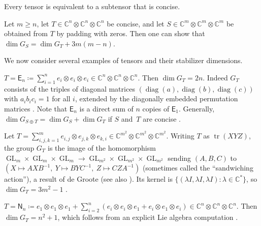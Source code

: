 \documentclass[11pt,a4paper]{article}
\numberwithin{equation}{section}
\newcommand{\CC}{\mathbb{C}}
\DeclareMathOperator{\GL}{GL}
\DeclareMathOperator{\diag}{diag}
\DeclareMathOperator{\tr}{tr}
\begin{document}
\begin{remark}[{\cite[Lemma~1.15]{MR4965400}}]
Every tensor is equivalent to a subtensor that is concise.
\end{remark}

\begin{remark}\label{rem:padding}
Let $m \geq n$, let $T \in \CC^n \otimes \CC^n \otimes \CC^n$ be concise, and let $S \in \CC^m \otimes \CC^m \otimes \CC^m$ be obtained from $T$ by padding with zeros. Then one can show that $\dim G_S = \dim G_T + 3m(m-n)$.
\end{remark}

%
%
%

We now consider several examples of tensors and their stabilizer dimensions.

\begin{example}[Diagonal]\label{ex:scalar}\label{ex:unit}
$T = \mathsf{E}_n \coloneqq \sum_{i=1}^n e_i \otimes e_i \otimes e_i \in \CC^n \otimes \CC^n \otimes \CC^n$. Then $\dim G_T = 2n$. Indeed $G_T$ consists of the triples of diagonal matrices $(\diag(a),\diag(b),\diag(c))$ with $a_ib_ic_i = 1$ for all $i$, extended by the diagonally embedded permutation matrices \cite[Theorem~4.3]{burgisser2015fundamentalinvariantsorbitclosures}.%
 Note that $\mathsf{E}_n$ is a direct sum of $n$ copies of $\mathsf{E}_1$. Generally, $\dim G_{S \oplus T} = \dim G_S + \dim G_T$ if $S$ and~$T$ are concise \cite[Lemma~4.2(i)]{Burgisser1997Degen-6409}.
\end{example}

%

\begin{example}\label{ex:matmul}
Let $T = \sum_{i,j,k=1}^m e_{i,j} \otimes e_{j,k} \otimes e_{k,i} \in \CC^{m^2} \otimes \CC^{m^2} \otimes \CC^{m^2}$. Writing $T$ as $\tr(XYZ)$, the group $G_T$ is the image of the homomorphism $\GL_m \times \GL_m \times \GL_m \to \GL_{m^2} \times \GL_{m^2} \times \GL_{m^2}$ sending $(A,B,C)$ to $(X \mapsto AXB^{-1},\ Y \mapsto BYC^{-1},\ Z \mapsto CZA^{-1})$ (sometimes called the ``sandwiching action''), a result of de Groote \cite{MR506377} (see also \cite[Theorem~4.5]{burgisser2015fundamentalinvariantsorbitclosures}). Its kernel is $\{(\lambda I, \lambda I, \lambda I) : \lambda \in \CC^*\}$, so $\dim G_T = 3m^2-1$ \cite[Lemma~4.2(ii)]{Burgisser1997Degen-6409}.%
\end{example}

\begin{example}\label{ex:null-algebra}
$T = \mathsf{N}_n \coloneqq e_1 \otimes e_1 \otimes e_1 + \sum_{i=2}^n (e_i \otimes e_i \otimes e_1 + e_i \otimes e_1 \otimes e_i) \in \CC^n \otimes \CC^n \otimes \CC^n$. Then $\dim G_T = n^2+1$, which follows from an explicit Lie algebra computation \cite[Proposition~3.2]{conner2021tensorsmaximalsymmetries}.
\end{example}
\end{document}
